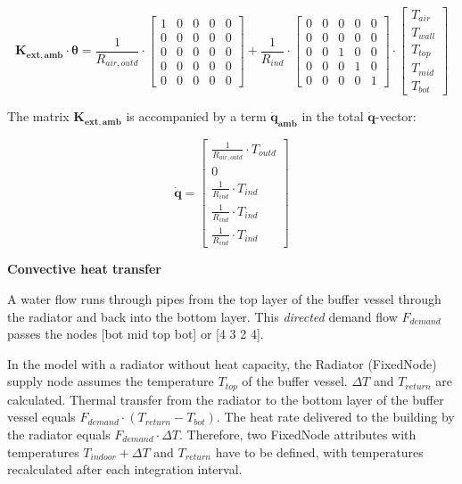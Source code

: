 \begin{equation}
	\mathbf{K_{ext,amb}} \cdot \boldsymbol{\theta} = 
	\frac{1}{R_{air,outd}} \cdot
	\begin{bmatrix}
		1 & 0 & 0 & 0 & 0 \\
		0 & 0 & 0 & 0 & 0 \\
		0 & 0 & 0 & 0 & 0 \\
		0 & 0 & 0 & 0 & 0 \\
		0 & 0 & 0 & 0 & 0  
	\end{bmatrix}
    +
	\frac{1}{R_{ind}} \cdot
	\begin{bmatrix}
		0 & 0 & 0 & 0 & 0 \\
		0 & 0 & 0 & 0 & 0 \\
		0 & 0 &  1 & 0 & 0 \\
		0 & 0 & 0 &  1 & 0 \\
		0 & 0 & 0 & 0 & 1  
	\end{bmatrix}
	\cdot
	\begin{bmatrix}
		T_{air} \\
		T_{wall} \\
		T_{top} \\
		T_{mid} \\
		T_{bot}
	\end{bmatrix}
\end{equation}


The matrix $\mathbf{K_{ext,amb}}$ is accompanied by a term $\mathbf{\dot{q}_{amb}}$ in the total $\mathbf{\dot{q}}$-vector:

\begin{equation}
	\mathbf{\dot{q}} = 
	\begin{bmatrix}
		\frac{1}{R_{air, outd}} \cdot T_{outd} \\
		0 \\
		\frac{1}{R_{ind}} \cdot T_{ind} \\
		\frac{1}{R_{ind}} \cdot T_{ind} \\
		\frac{1}{R_{ind}} \cdot T_{ind} 
	\end{bmatrix}
\end{equation}

\textbf{Convective heat transfer}

A water flow runs through pipes from the top layer of the buffer vessel through the radiator and back into the bottom layer. This \emph{directed} demand flow $F_{demand}$ passes the nodes [bot mid top bot] or [4 3 2 4].

In the model with a radiator without heat capacity, the Radiator (\textsf{FixedNode}) supply node assumes the temperature $T_{top}$ of the buffer vessel. $\Delta T$ and $T_{return}$ are calculated. Thermal transfer from the radiator to the bottom layer of the buffer vessel equals $F_{demand} \cdot (T_{return} - T_{bot})$. The heat rate delivered to the building by the radiator equals $F_{demand} \cdot \Delta T$. 
Therefore, two \textsf{FixedNode} attributes with temperatures $T_{indoor} + \Delta T$ and $T_{return}$ have to be defined, with temperatures recalculated after each integration interval.

